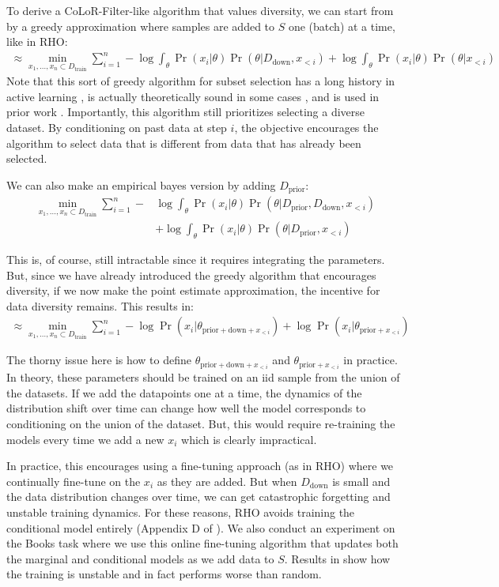 \documentclass{article}
\newcommand{\Dprior}{D_{\text{prior}}}
\newcommand{\Ddown}{D_{\text{down}}}
\newcommand{\Dtrain}{D_{\text{train}}}
\newcommand{\thetapriordownx}{\theta_{\text{prior}+ \text{down}+x_{<i}}}
\newcommand{\thetapriorx}{\theta_{\text{prior}+x_{<i}}}
\begin{document}
To derive a CoLoR-Filter-like algorithm that values diversity, we can start from  by a greedy approximation where samples are added to $ S $ one (batch) at a time, like in RHO:
\begin{align}
     \approx \min_{x_1, \dots, x_n \subset \Dtrain} \sum_{i=1}^n  -\log \int_\theta\Pr(x_i| \theta)\Pr(\theta | \Ddown, x_{<i}) + \log \int_\theta \Pr(x_i | \theta)\Pr(\theta| x_{<i})
\end{align}
Note that this sort of greedy algorithm for subset selection has a long history in active learning \citep{das2018}, is actually theoretically sound in some cases \citep{Nemhauser1978AnAO}, and is used in prior work \citep{ash2021gone, mindermann2022prioritized}. Importantly, this algorithm still prioritizes selecting a diverse dataset. By conditioning on past data at step $ i$, the objective encourages the algorithm to select data that is different from data that has already been selected.

We can also make an empirical bayes version by adding $ \Dprior$:
\begin{align}
     \min_{x_1, \dots, x_n \subset \Dtrain} \sum_{i=1}^n  -&\log \int_\theta\Pr(x_i| \theta)\Pr(\theta | \Dprior, \Ddown, x_{<i}) \\ &+ \log \int_\theta \Pr(x_i | \theta)\Pr(\theta| \Dprior, x_{<i})
\end{align}

This is, of course, still intractable since it requires integrating the parameters. But, since we have already introduced the greedy algorithm that encourages diversity, if we now make the point estimate approximation, the incentive for data diversity remains. This results in:
\begin{align}\label{eq:online}
     \approx \min_{x_1, \dots, x_n \subset \Dtrain} \sum_{i=1}^n  -\log \Pr(x_i| \thetapriordownx) + \log  \Pr(x_i | \thetapriorx)
\end{align}

The thorny issue here is how to define $ \thetapriordownx$ and $ \thetapriorx$ in practice. In theory, these parameters should be trained on an iid sample from the union of the datasets. If we add the datapoints one at a time, the dynamics of the distribution shift over time can change how well the model corresponds to conditioning on the union of the dataset. But, this would require re-training the models every time we add a new $ x_i$ which is clearly impractical.


In practice, this encourages using a fine-tuning approach (as in RHO) where we continually fine-tune on the $ x_i$ as they are added. But when $ \Ddown$ is small and the data distribution changes over time, we can get catastrophic forgetting and unstable training dynamics. For these reasons, RHO avoids training the conditional model entirely (Appendix D of \citet{mindermann2022prioritized}). We also conduct an experiment on the Books task where we use this online fine-tuning algorithm that updates both the marginal and conditional models as we add data to $ S$. Results in  show how the training is unstable and in fact performs worse than random.
\end{document}
